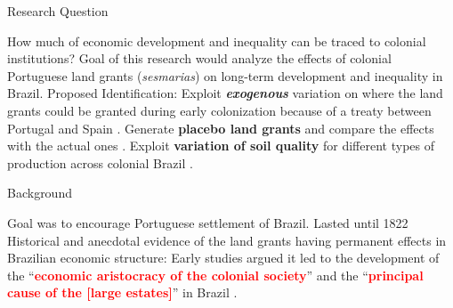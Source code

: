\documentclass[aspectratio=1610]{beamer}
\begin{document}
\begin{frame}{Research Question}
    \begin{outline}
        \1 How much of economic development and inequality can be traced to colonial institutions?
            \vspace{2mm}
            \2 Goal of this research would analyze the effects of colonial Portuguese land grants (\textit{sesmarias}) on long-term development and inequality in Brazil.
            \vspace{2mm}
        \pause 
        \1 Proposed Identification:
            \vspace{2mm}
            \2 Exploit \textbf{\textit{exogenous}} variation on where the land grants could be granted during early colonization because of a treaty between Portugal and Spain \parencite{Laudares2022-vy}. 
            \vspace{2mm}
            \2 Generate \textbf{placebo land grants} and compare the effects with the actual ones \parencite{Dell2019-np}.
            \vspace{2mm}
            \2 Exploit \textbf{variation of soil quality} for different types of production across colonial Brazil \parencite{Wigton-Jones2020-ex}.
    \end{outline}
\end{frame}

\begin{frame}{Background}
    \begin{outline}
        \1 Goal was to encourage Portuguese settlement of Brazil.
        \vspace{2mm}
        \pause 
        \1 Lasted until 1822
        \pause
        \vspace{2mm}
        \1 Historical and anecdotal evidence of the land grants having permanent effects in Brazilian economic structure:
        \vspace{2mm}
            \2 Early studies argued it led to the development of the ``\textcolor{red}{\textbf{economic aristocracy of the colonial society}}'' and the ``\textcolor{red}{\textbf{principal cause of the [large estates]}}'' in Brazil \parencites[p.~36]{Lima2002-kd}[p.~48]{Da_Costa_Porto1979-dz}.
    \end{outline}    
\end{frame}
\end{document}
